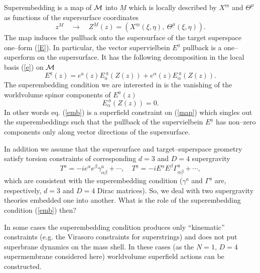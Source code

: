 \documentclass[a4paper,12pt]{article}
\begin{document}
Superembedding is a map of ${\cal M}$ into $\underline M$ which is
locally described by $X^{\underline m}$ and
$\Theta^{\underline\mu}$ as functions of the supersurface
coordinates
\begin{equation}\label{map}
z^M\quad \rightarrow \quad Z^{\underline M}(z)=\left(X^{\underline
m}(\xi, \eta),~\Theta^{\underline\mu}(\xi,\eta)\right).
\end{equation}
 The map induces the pullback onto the supersurface of the
target superspace one--form (\ref{E}). In particular, the vector
supervielbein $E^{\underline a}$ pullback is a one--superform on
the supersurface. It has the following decomposition in the local
basis (\ref{e}) on $\cal M$
\begin{equation}\label{pull}
E^{\underline a}(z)=e^a(z)E^{~\underline
a}_a(Z(z))+e^\alpha(z)E^{~\underline a}_\alpha(Z(z)).
\end{equation}
The superembedding condition we are interested in is the
vanishing of the worldvolume spinor components of $E^{\underline
a}(z)$
\begin{equation}\label{emb}
E^{~\underline a}_\alpha(Z(z))=0.
\end{equation}
In other words eq. (\ref{emb}) is a superfield constraint on
(\ref{map}) which singles out the superembeddings such that the
pullback of the supervielbein $E^{\underline a}$ has non--zero
components only along vector directions of the supersurface.

In addition we assume that the supersurface and
target--superspace geometry satisfy torsion constraints of
corresponding $d=3$ and $D=4$ supergravity
\begin{equation}\label{torsion}
T^a=-ie^\alpha e^\beta \gamma_{\alpha\beta}^a +
\cdots, \quad T^{\underline a}=
-iE^{\underline\alpha} E^{\underline\beta}
\Gamma_{\underline\alpha\underline\beta}^{\underline a} +
\cdots,
\end{equation}
which are consistent with the superembedding condition
($\gamma^a$ and $\Gamma^{\underline a}$ are, respectively, $d=3$
and $D=4$ Dirac matrices). So, we deal with two supergravity
theories embedded one into another. What is the role of the
superembedding condition (\ref{emb}) then?

In some cases the superembedding condition produces only
``kinematic'' constraints (e.g. the Virasoro constraints for
superstrings) and does not put superbrane dynamics on the mass
shell. In these cases (as the $N=1$, $D=4$ supermembrane
considered here) worldvolume superfield actions can be
constructed.
\end{document}
